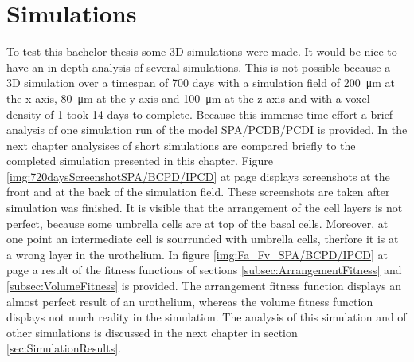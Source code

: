 \section{Simulations}
To test this bachelor thesis some 3D simulations were made. It would be nice to have an in depth analysis of several simulations. This is not possible because a 3D simulation over a timespan of 700 days with a simulation field of \SI{200}{\micro\metre} at the x-axis, \SI{80}{\micro\metre} at the y-axis and \SI{100}{\micro\metre} at the z-axis and with a voxel density of 1 took 14 days to complete. Because this immense time effort a brief analysis of one simulation run of the model SPA/PCDB/PCDI is provided. In the next chapter analysises of short simulations are compared briefly to the completed simulation presented in this chapter. \newline
Figure \ref{img:720daysScreenshotSPA/BCPD/IPCD} at page \pageref{img:720daysScreenshotSPA/BCPD/IPCD} displays screenshots at the front and at the back of the simulation field. These screenshots are taken after simulation was finished. It is visible that the arrangement of the cell layers is not perfect, because some umbrella cells are at top of the basal cells. Moreover, at one point an intermediate cell is sourrunded with umbrella cells, therfore it is at a wrong layer in the urothelium. \newline
In figure \ref{img:Fa_Fv_SPA/BCPD/IPCD} at page \pageref{img:Fa_Fv_SPA/BCPD/IPCD} a result of the fitness functions of sections \ref{subsec:ArrangementFitness} and \ref{subsec:VolumeFitness} is provided. The arrangement fitness function displays an almost perfect result of an urothelium, whereas the volume fitness function displays not much reality in the simulation.
The analysis of this simulation and of other simulations is discussed in the next chapter in section \ref{sec:SimulationResults}.
